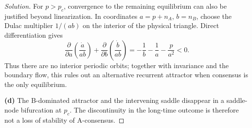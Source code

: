\documentclass[10pt]{amsart}
\newenvironment{solution}
{\begin{proof}[Solution]}
{\end{proof}}
\begin{document}
\begin{onehalfspace}
\begin{solution}
For $p>p_c$, convergence to the remaining equilibrium can also be justified beyond linearization. In coordinates $a=p+n_A$, $b=n_B$, choose the Dulac multiplier $1/(ab)$ on the interior of the physical triangle. Direct differentiation gives
\[
 \frac{\partial}{\partial a}\left(\frac{\dot a}{ab}\right)
 +\frac{\partial}{\partial b}\left(\frac{\dot b}{ab}\right)
 =-\frac1b-\frac1a-\frac{p}{a^2}<0.
\]
Thus there are no interior periodic orbits; together with invariance and the boundary flow, this rules out an alternative recurrent attractor when consensus is the only equilibrium.

\textbf{(d)} The B-dominated attractor and the intervening saddle disappear in a saddle-node bifurcation at $p_c$. The discontinuity in the long-time outcome is therefore not a loss of stability of A-consensus.


\end{solution}
\end{onehalfspace}
\end{document}
